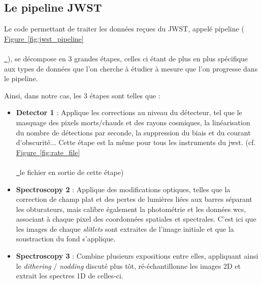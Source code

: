 \documentclass[12pt, a4paper]{article}
\newcommand*{\figref}[2][]{%
  \hyperref[{#2}]{%
    Figure~\ref*{#2}%
    \ifx\\#1\\%
    \else
      \,#1%
    \fi
  }%
}
\begin{document}
\subsection{Le pipeline JWST}

Le code permettant de traiter les données reçues du JWST, appelé pipeline (\figref{fig:jwst_pipeline}), se décompose en 3 grandes étapes, celles ci étant de plus en plus spécifique aux types de données que l'on cherche à étudier à mesure que l'on progresse dans le pipeline.

Ainsi, dans notre cas, les 3 étapes sont telles que :\\


\begin{minipage}{.45\linewidth}
  \begin{itemize}[left=0cm]
    \item \textbf{Detector 1} : Applique les corrections au niveau du détecteur, tel que le masquage des pixels morts/chauds et des rayons cosmiques, la linéarisation du nombre de détections par seconde, la suppression du biais et du courant d'obscurité... Cette étape est la même pour tous les instruments du \gls{jwst}. (cf. \figref{fig:rate_file} le fichier en sortie de cette étape)
    \item \textbf{Spectroscopy 2} : Applique des modifications optiques, telles que la correction de champ plat et des pertes de lumières liées aux barres séparant les obturateurs, mais calibre également la photométrie et les données \gls{wcs}, associant à chaque pixel des coordonnées spatiales et spectrales. C'est ici que les images de chaque \textit{slitlets} sont extraites de l'image initiale et que la soustraction du fond s'applique.
    \item \textbf{Spectroscopy 3} : Combine plusieurs expositions entre elles, appliquant ainsi le \textit{dithering} / \textit{nodding} discuté plus tôt, ré-échantillonne les images 2D et extrait les spectres 1D de celles-ci.
  \end{itemize}
  \end{minipage}
  \hfill
\end{document}
